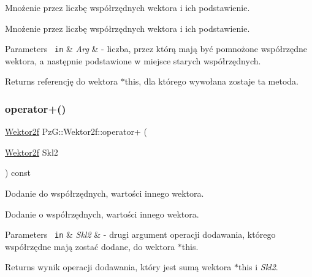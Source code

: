Mnożenie przez liczbę współrzędnych wektora i ich podstawienie. 

Mnożenie przez liczbę współrzędnych wektora i ich podstawienie. 
\begin{DoxyParams}[1]{Parameters}
\mbox{\texttt{ in}}  & {\em Arg} & -\/ liczba, przez którą mają być pomnożone współrzędne wektora, a następnie podstawione w miejsce starych współrzędnych. \\
\hline
\end{DoxyParams}
\begin{DoxyReturn}{Returns}
referencję do wektora {\ttfamily $\ast$this}, dla którego wywołana zostaje ta metoda. 
\end{DoxyReturn}
\mbox{\label{class_pz_g_1_1_wektor2f_ab63c11faf70db9a241b99112b022226a}} 
\subsubsection{\texorpdfstring{operator+()}{operator+()}}
{\footnotesize\ttfamily \mbox{\hyperlink{class_pz_g_1_1_wektor2f}{Wektor2f}} Pz\+G\+::\+Wektor2f\+::operator+ (\begin{DoxyParamCaption}\item[{\mbox{\hyperlink{class_pz_g_1_1_wektor2f}{Wektor2f}}}]{Skl2 }\end{DoxyParamCaption}) const\hspace{0.3cm}{\ttfamily [inline]}}



Dodanie do współrzędnych, wartości innego wektora. 

Dodanie o współrzędnych, wartości innego wektora. 
\begin{DoxyParams}[1]{Parameters}
\mbox{\texttt{ in}}  & {\em Skl2} & -\/ drugi argument operacji dodawania, którego współrzędne mają zostać dodane, do wektora {\ttfamily $\ast$this}. \\
\hline
\end{DoxyParams}
\begin{DoxyReturn}{Returns}
wynik operacji dodawania, który jest sumą wektora {\ttfamily $\ast$this} i {\itshape Skl2}. 
\end{DoxyReturn}
\mbox{\label{class_pz_g_1_1_wektor2f_a35c467ecd7f9817d0cf3a232d50ecbcc}} 
